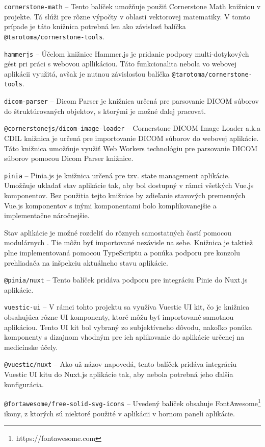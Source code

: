 \texttt{cornerstone-math} -- Tento balíček umožňuje použiť Cornerstone Math knižnicu v projekte. Tá slúži pre rôzne výpočty v oblasti vektorovej matematiky. V tomto prípade je táto knižnica potrebná len ako závislosť balíčka \texttt{@tarotoma/cornerstone-tools}.

\texttt{hammerjs} -- Účelom knižnice Hammer.js je pridanie podpory multi-dotykových gést pri práci s webovou apllikáciou. Táto funkcionalita nebola vo webovej aplikácii využitá, avšak je nutnou závislosťou balíčka \texttt{@tarotoma/cornerstone-tools}.

\texttt{dicom-parser} -- Dicom Parser je knižnica určená pre parsovanie DICOM súborov do štruktúrovaných objektov, s ktorými je možné ďalej pracovať.

\texttt{@cornerstonejs/dicom-image-loader} -- Cornerstone DICOM Image Loader a.k.a CDIL knižnica je určená pre importovanie DICOM súborov do webovej aplikácie. Táto knižnica umožňuje využiť Web Workers technológiu pre parsovanie DICOM súborov pomocou Dicom Parser knižnice.

\texttt{pinia} -- Pinia.js je knižnica určená pre tzv. state management aplikácie. Umožňuje ukladať stav aplikácie tak, aby bol dostupný v rámci všetkých Vue.js komponentov. Bez použitia tejto knižnice by zdieľanie stavových premenných Vue.js komponentov s inými komponentami bolo komplikovanejšie a implementačne náročnejšie.

Stav aplikácie je možné rozdeliť do rôznych samostatných častí pomocou modulárnych . Tie môžu byť importované nezávisle na sebe. Knižnica je taktiež plne implementovaná pomocou TypeScriptu a ponúka podporu pre konzolu prehliadača na inšpekciu aktuálneho stavu aplikácie.

\texttt{@pinia/nuxt} -- Tento balíček pridáva podporu pre integráciu Pinie do Nuxt.js aplikácie.

\texttt{vuestic-ui} -- V rámci tohto projektu sa využíva Vuestic UI kit, čo je knižnica obsahujúca rôzne UI komponenty, ktoré môžu byť importované samotnou aplikáciou. Tento UI kit bol vybraný zo subjektívneho dôvodu, nakoľko ponúka komponenty s dizajnom vhodným pre ich aplikovanie do aplikácie určenej na medicínske účely.

\texttt{@vuestic/nuxt} -- Ako už názov napovedá, tento balíček pridáva integráciu Vuestic UI kitu do Nuxt.js aplikácie tak, aby nebola potrebná jeho ďalšia konfigurácia.

\texttt{@fortawesome/free-solid-svg-icons} -- Uvedený balíček obsahuje FontAwesome\footnote{https://fontawesome.com} ikony, z ktorých sú niektoré použité v aplikácii v hornom paneli aplikácie.

